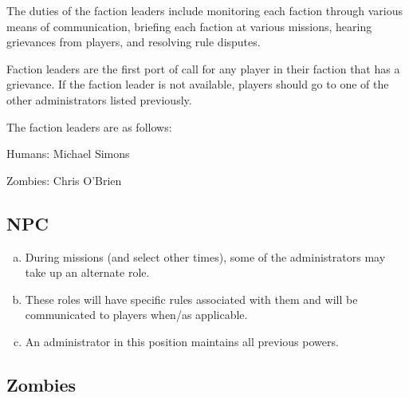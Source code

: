 \documentclass[a4paper,12pt]{article}
\newcommand{\HumanLeader}{Michael Simons}
\newcommand{\ZombieLeader}{Chris O'Brien}
\begin{document}
The duties of the faction leaders include monitoring each faction through various means of communication, briefing each faction at various missions, hearing grievances from players, and resolving rule disputes.

Faction leaders are the first port of call for any player in their faction that has a grievance. If the faction leader is not available, players should go to one of the other administrators listed previously.

The faction leaders are as follows:

\begin{center}
    \par Humans: \HumanLeader
    \par Zombies: \ZombieLeader
\end{center}


%

\subsection{NPC}

\begin{enumerate}[(a)]
    \item During missions (and select other times), some of the administrators may take up an alternate role.
    \item These roles will have specific rules associated with them and will be communicated to players when/as applicable.
    \item An administrator in this position maintains all previous powers.    
\end{enumerate}

\subsection{Zombies}
\end{document}
